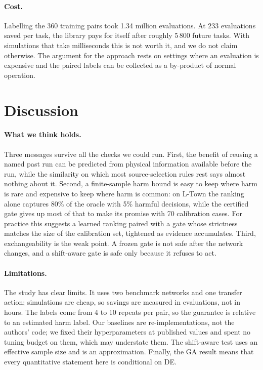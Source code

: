 \documentclass[11pt]{article}
\begin{document}
\paragraph{Cost.} Labelling the 360 training pairs took 1.34 million evaluations. At 233 evaluations saved per task,
the library pays for itself after roughly 5\,800 future tasks. With simulations that take milliseconds this is not
worth it, and we do not claim otherwise. The argument for the approach rests on settings where an evaluation is
expensive and the paired labels can be collected as a by-product of normal operation.

\section{Discussion}\label{sec:discussion}

\paragraph{What we think holds.} Three messages survive all the checks we could run. First, the benefit of reusing a
named past run can be predicted from physical information available before the run, while the similarity on which
most source-selection rules rest says almost nothing about it. Second, a finite-sample harm bound is easy to keep
where harm is rare and expensive to keep where harm is common: on L-Town the ranking alone captures 80\% of the
oracle with 5\% harmful decisions, while the certified gate gives up most of that to make its promise with 70
calibration cases. For practice this suggests a learned ranking paired with a gate whose strictness matches the
size of the calibration set, tightened as evidence accumulates. Third, exchangeability is the weak point. A frozen
gate is not safe after the network changes, and a shift-aware gate is safe only because it refuses to act.

\paragraph{Limitations.} The study has clear limits. It uses two benchmark networks and one transfer action;
simulations are cheap, so savings are measured in evaluations, not in hours. The labels come from 4 to 10 repeats per
pair, so the guarantee is relative to an estimated harm label. Our baselines are re-implementations, not the
authors' code; we fixed their hyperparameters at published values and spent no tuning budget on them, which may
understate them. The shift-aware test uses an effective sample size and is an approximation. Finally, the GA result
means that every quantitative statement here is conditional on DE.
\end{document}
